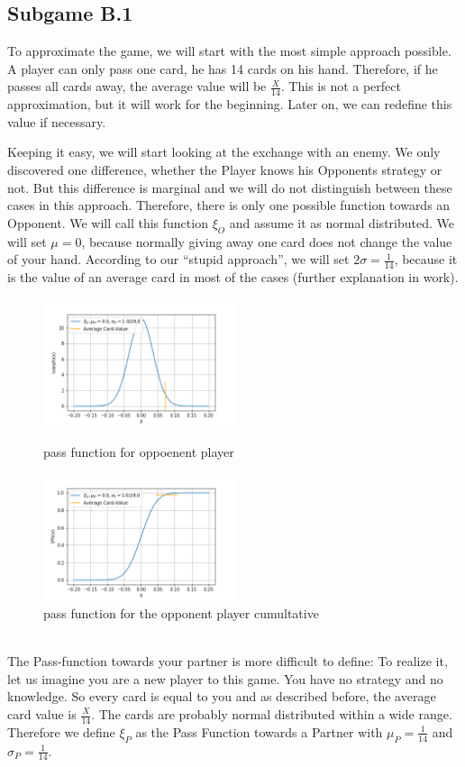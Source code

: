 \subsection{Subgame B.1}
To approximate the game, we will start with the most simple approach possible. A player can only pass one card, he has 14 cards on his hand. Therefore, if he passes all cards away, the average value will be $\frac{X}{14}$. This is not a perfect approximation, but it will work for the beginning. Later on, we can redefine this value if necessary. 

Keeping it easy, we will start looking at the exchange with an enemy. We only discovered one difference, whether the Player knows his Opponents strategy or not. But this difference is marginal and we will do not distinguish between these cases in this approach. 
Therefore, there is only one possible function towards an Opponent. We will call this function $\xi_O$ and assume it as normal distributed. We will set $\mu = 0$, because normally giving away one card does not change the value of your hand. According to our “stupid approach”, we will set $2\sigma = \frac{1}{14}$, because it is the value of an average card in most of the cases (further explanation in work). \\
\begin{figure}[h]
    \centering
    \includegraphics[width=0.5\textwidth]{Bilder/pass_function_ot}
    \caption{pass function for oppoenent player}
    \label{fig:meine-grafik}
    \centering
    \includegraphics[width=0.5\textwidth]{Bilder/pass_function_ot_cumultative}
    \caption{pass function for the opponent player cumultative}
    \label{fig:meine-grafik}
\end{figure}
\\
The Pass-function towards your partner is more difficult to define: To realize it, let us imagine you are a new player to this game. You have no strategy and no knowledge. So every card is equal to you and as described before, the average card value is $\frac{X}{14}$. The cards are probably normal distributed within a wide range. Therefore we define $\xi_P$ as the Pass Function towards a Partner with $\mu_P = \frac{1}{14}$ and $\sigma_P = \frac{1}{14}$. 

